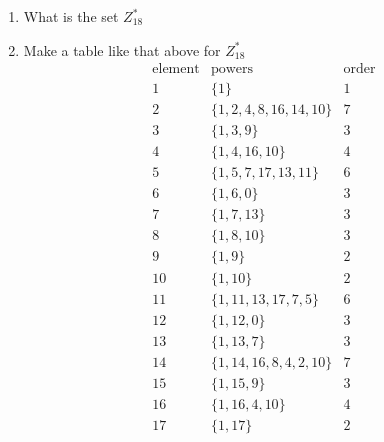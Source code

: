 \documentclass[12pt]{amsart}
\newcommand{\benu}{\begin{enumerate}}
\theoremstyle{definition}
\begin{document}

\newpage %

\item
\benu
\item What is the set $Z_{18}^*$
\item Make a table like that above for $Z_{18}^*$
\begin{equation*}
\begin{array}{c|c|c}
\text{element} & \text{powers} & \text{order}

\\
\hline
1 & \{1\} & 1
\\
\hline
2 & \{1, 2, 4, 8, 16, 14, 10\} & 7
\\
\hline
3 & \{1, 3, 9\} & 3
\\
\hline
4 & \{1, 4, 16, 10\} & 4
\\
\hline
5 & \{1, 5, 7, 17, 13, 11\} & 6
\\
\hline
6 & \{1, 6, 0\} & 3
\\
\hline
7 & \{1, 7, 13\} & 3
\\
\hline
8 & \{1, 8, 10\} & 3
\\
\hline
9 & \{1, 9\} & 2
\\
\hline
10 & \{1, 10\} & 2
\\
\hline
11 & \{1, 11, 13, 17, 7, 5\} & 6
\\
\hline
12 & \{1, 12, 0\} & 3
\\
\hline
13 & \{1, 13, 7\} & 3
\\
\hline
14 & \{1, 14, 16, 8, 4, 2, 10\} & 7
\\
\hline
15 & \{1, 15, 9\} & 3
\\
\hline
16 & \{1, 16, 4, 10\} & 4
\\
\hline
17 & \{1, 17\} & 2


\end{array}
\end{equation*}
\end{enumerate}
\end{document}
